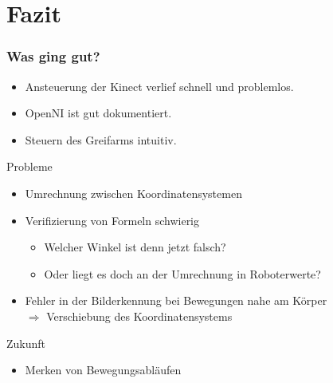 \section{Fazit}
\begin{frame}
\frametitle{Was ging gut?}
\begin{itemize}
\item Ansteuerung der Kinect verlief schnell und problemlos.
\item OpenNI ist gut dokumentiert.
\item Steuern des Greifarms intuitiv.
\end{itemize}
\end{frame}

\begin{frame}{Probleme}
\begin{itemize}
	\item Umrechnung zwischen Koordinatensystemen
	\item Verifizierung von Formeln schwierig
		\begin{itemize}
		\item Welcher Winkel ist denn jetzt falsch?
		\item Oder liegt es doch an der Umrechnung in Roboterwerte?
		\end{itemize}
	\item Fehler in der Bilderkennung bei Bewegungen nahe am Körper\\$\Rightarrow$ Verschiebung des Koordinatensystems
\end{itemize}
\end{frame}


\begin{frame}{Zukunft}
	\begin{itemize}
	\item Merken von Bewegungsabläufen
	\end{itemize}
\end{frame}